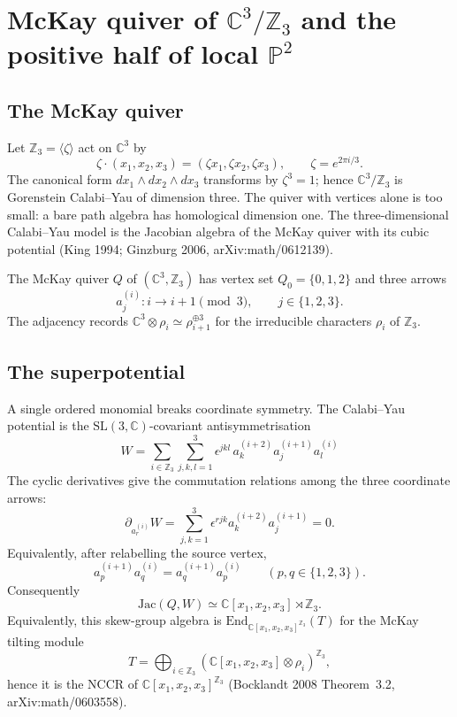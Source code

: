 \providecommand{\kch}{\kappa_{\mathrm{ch}}}
\providecommand{\kcat}{\kappa_{\mathrm{cat}}}
\providecommand{\kBKM}{\kappa_{\mathrm{BKM}}}
\providecommand{\kfib}{\kappa_{\mathrm{fiber}}}
\providecommand{\Ypos}{Y^{+}}
\providecommand{\GHilb}{G\text{-}\mathrm{Hilb}}
\providecommand{\ZZ}{\mathbb{Z}}
\providecommand{\CC}{\mathbb{C}}
\providecommand{\PP}{\mathbb{P}}
\providecommand{\Db}{D^{b}}
\providecommand{\coh}{\mathrm{coh}}
\providecommand{\CoHA}{\mathrm{CoHA}}
\providecommand{\Jac}{\mathrm{Jac}}
\providecommand{\GL}{\mathrm{GL}}

\section*{McKay quiver of $\CC^{3}/\ZZ_{3}$ and the positive half of local $\PP^{2}$}

\subsection*{The McKay quiver}

Let $\ZZ_{3} = \langle \zeta \rangle$ act on $\CC^{3}$ by
\[
  \zeta \cdot (x_{1},x_{2},x_{3})
  =(\zeta x_{1},\zeta x_{2},\zeta x_{3}),
  \qquad \zeta=e^{2\pi i/3}.
\]
The canonical form
$dx_{1}\wedge dx_{2}\wedge dx_{3}$ transforms by $\zeta^{3}=1$; hence
$\CC^3/\ZZ_3$ is Gorenstein Calabi--Yau of dimension three. The quiver
with vertices alone is too small: a bare path algebra has homological
dimension one. The three-dimensional Calabi--Yau model is the Jacobian
algebra of the McKay quiver with its cubic potential (King 1994;
Ginzburg 2006, arXiv:math/0612139).

The McKay quiver $Q$ of $(\CC^{3},\ZZ_{3})$ has vertex set
$Q_{0}=\{0,1,2\}$ and three arrows
\[
  a_{j}^{(i)}: i\longrightarrow i+1 \pmod 3,
  \qquad j\in\{1,2,3\}.
\]
The adjacency records
$\CC^{3}\otimes\rho_i\simeq \rho_{i+1}^{\oplus 3}$ for the irreducible
characters $\rho_i$ of $\ZZ_3$.

\subsection*{The superpotential}

A single ordered monomial breaks coordinate symmetry. The Calabi--Yau
potential is the $\mathrm{SL}(3,\CC)$-covariant antisymmetrisation
\[
  W
  =\sum_{i\in\ZZ_{3}}\sum_{j,k,l=1}^{3}
    \epsilon^{jkl}\,
    a_{k}^{(i+2)}a_{j}^{(i+1)}a_{l}^{(i)}
\]
The cyclic derivatives give the commutation relations among the three
coordinate arrows:
\[
  \partial_{a_r^{(i)}}W
  =
  \sum_{j,k=1}^{3}\epsilon^{rjk}a_k^{(i+2)}a_j^{(i+1)}
  =0 .
\]
Equivalently, after relabelling the source vertex,
\[
  a_p^{(i+1)}a_q^{(i)}=a_q^{(i+1)}a_p^{(i)}
  \qquad (p,q\in\{1,2,3\}).
\]
Consequently
\[
  \Jac(Q,W)
  \simeq \CC[x_1,x_2,x_3]\rtimes \ZZ_3 .
\]
Equivalently, this skew-group algebra is
$\mathrm{End}_{\CC[x_1,x_2,x_3]^{\ZZ_3}}(T)$ for the McKay tilting
module
\[
  T=\bigoplus_{i\in\ZZ_3}
    \left(\CC[x_1,x_2,x_3]\otimes\rho_i\right)^{\ZZ_3},
\]
hence it is the NCCR of $\CC[x_1,x_2,x_3]^{\ZZ_3}$
(Bocklandt 2008 Theorem~3.2, arXiv:math/0603558).

